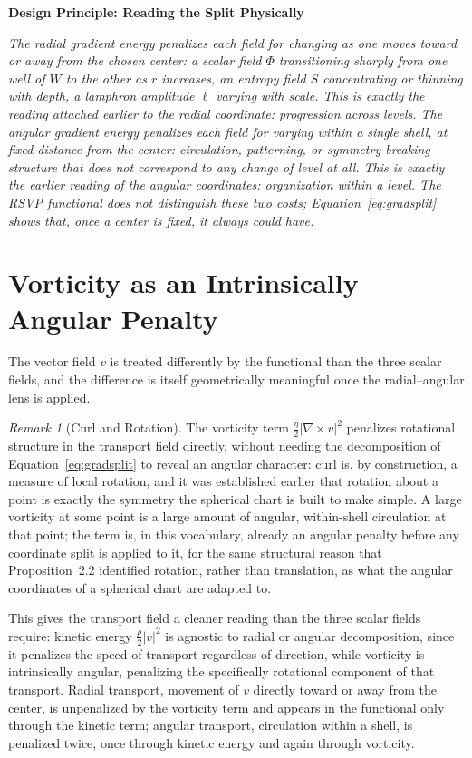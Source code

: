\documentclass[11pt,fleqn]{book}
\numberwithin{equation}{chapter}
\newenvironment{principle}[1]
  {\begin{principleEnv}
   \noindent\textbf{Design Principle: #1}\par\smallskip\itshape}
  {\end{principleEnv}}
\theoremstyle{plain}
\theoremstyle{definition}
\theoremstyle{remark}
\newtheorem{remark}[theorem]{Remark}
\begin{document}
\begin{principle}{Reading the Split Physically}
The radial gradient energy penalizes each field for changing as one moves toward or away from the chosen center: a scalar field \(\Phi\) transitioning sharply from one well of \(W\) to the other as \(r\) increases, an entropy field \(S\) concentrating or thinning with depth, a lamphron amplitude \(\ell\) varying with scale. This is exactly the reading attached earlier to the radial coordinate: progression across levels. The angular gradient energy penalizes each field for varying within a single shell, at fixed distance from the center: circulation, patterning, or symmetry-breaking structure that does not correspond to any change of level at all. This is exactly the earlier reading of the angular coordinates: organization within a level. The RSVP functional does not distinguish these two costs; Equation~\eqref{eq:gradsplit} shows that, once a center is fixed, it always could have.
\end{principle}

\section{Vorticity as an Intrinsically Angular Penalty}

The vector field \(v\) is treated differently by the functional than the three scalar fields, and the difference is itself geometrically meaningful once the radial--angular lens is applied.

\begin{remark}[Curl and Rotation]
The vorticity term \(\frac\eta2|\nabla\times v|^2\) penalizes rotational structure in the transport field directly, without needing the decomposition of Equation~\eqref{eq:gradsplit} to reveal an angular character: curl is, by construction, a measure of local rotation, and it was established earlier that rotation about a point is exactly the symmetry the spherical chart is built to make simple. A large vorticity at some point is a large amount of angular, within-shell circulation at that point; the term is, in this vocabulary, already an angular penalty before any coordinate split is applied to it, for the same structural reason that Proposition~2.2 identified rotation, rather than translation, as what the angular coordinates of a spherical chart are adapted to.
\end{remark}

This gives the transport field a cleaner reading than the three scalar fields require: kinetic energy \(\frac\rho2|v|^2\) is agnostic to radial or angular decomposition, since it penalizes the speed of transport regardless of direction, while vorticity is intrinsically angular, penalizing the specifically rotational component of that transport. Radial transport, movement of \(v\) directly toward or away from the center, is unpenalized by the vorticity term and appears in the functional only through the kinetic term; angular transport, circulation within a shell, is penalized twice, once through kinetic energy and again through vorticity.
\end{document}
